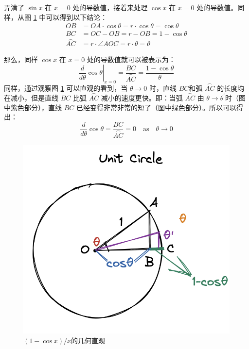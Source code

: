 \documentclass{ctexart}
\numberwithin{equation}{section}
\numberwithin{figure}{section}
\begin{document}
弄清了  \(\sin x\) 在 \(x = 0\) 处的导数值，接着来处理 \(\cos x\) 在 \(x = 0\) 处的导数值。同样，从图 \ref{fig:(1-cosx)/x} 中可以得到以下结论：
\begin{align*}
    OB                   & = OA\cdot \cos \theta = r\cdot \cos \theta = \cos \theta \\
    BC                   & = OC - OB = r - OB = 1 - \cos \theta                     \\
    \overset{\frown}{AC} & = r \cdot \angle AOC = r \cdot \theta = \theta
\end{align*}

那么，同样 \(\cos x\) 在 \(x = 0\) 处的导数值就可以被表示为：
\begin{equation*}
    \left.\frac{d}{d\theta}\cos \theta\right|_{x=0} = \frac{BC}{\overset{\frown}{AC}} = \frac{1 - \cos \theta}{\theta}
\end{equation*}
同样，通过观察图 \ref{fig:(1-cosx)/x} 可以直观的看到，当 \(\theta \to 0\) 时，直线 \(BC\)和弧 \(\overset{\frown}{AC}\) 的长度均在减小，但是直线 \(BC\) 比弧 \(\overset{\frown}{AC}\) 减小的速度更快。即：当弧
\(\overset{\frown}{AC}\) 由 \(\theta \to \theta^{\prime}\)时（图中紫色部分），直线 \(BC\) 已经变得非常非常的短了（图中绿色部分）。所以可以得出：
\begin{equation}\label{eq:DerivativeofCosineatx=0}
    \frac{d}{d\theta}\cos \theta = \frac{BC}{\overset{\frown}{AC}} = 0 \quad \text{as} \quad \theta \to 0
\end{equation}
\begin{figure}[H]
    \centering
    \includegraphics[scale=0.5]{images/circle_cosx.png}
    \caption{\((1-\cos x)/x\)的几何直观}\label{fig:(1-cosx)/x}
\end{figure}
\end{document}
